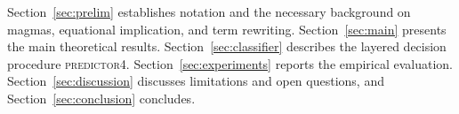 Section~\ref{sec:prelim} establishes notation and the necessary background on magmas,
equational implication, and term rewriting.  Section~\ref{sec:main} presents the main
theoretical results.  Section~\ref{sec:classifier} describes the layered decision
procedure \textsc{predictor4}.  Section~\ref{sec:experiments} reports the empirical
evaluation.  Section~\ref{sec:discussion} discusses limitations and open questions, and
Section~\ref{sec:conclusion} concludes.
